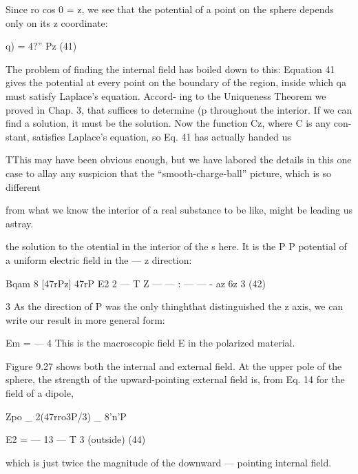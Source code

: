 {Since ro cos 0 = z, we see that the potential of a point on the sphere
depends only on its z coordinate:

\begin{equation}
\end{equation}
q) = 4?'' Pz (41)

The problem of finding the internal field has boiled down to this:
Equation 41 gives the potential at every point on the boundary of
the region, inside which qa must satisfy Laplace's equation. Accord-
ing to the Uniqueness Theorem we proved in Chap. 3, that suffices
to determine (p throughout the interior. If we can find a solution,
it must be the solution. Now the function Cz, where C is any con-
stant, satisfies Laplace's equation, so Eq. 41 has actually handed us

TThis may have been obvious enough, but we have labored the details in this one
case to allay any suspicion that the ``smooth-charge-ball'' picture, which is so different

from what we know the interior of a real substance to be like, might be leading us
astray.

the solution to the otential in the interior of the s here. It is the
P P
potential of a uniform electric field in the  --- z direction:

\begin{equation}
\end{equation}
Bqam 8 [47rPz] 47rP
E2 2  ---  T Z  ---   ---  :  ---  ---  -
az 6z 3 (42)

3
As the direction of P was the only thinghthat distinguished the z axis,
we can write our result in more general form:

\begin{equation}
\end{equation}
Em =  ---  4%
This is the macroscopic field E in the polarized material.

Figure 9.27 shows both the internal and external field. At the
upper pole of the sphere, the strength of the upward-pointing external
field is, from Eq. 14 for the field of a dipole,

\begin{equation}
\end{equation}
Zpo _ 2(47rro3P/3) _ 8'n'P

E2 =  --- 13 ---  T 3 (outside) (44)

which is just twice the magnitude of the downward --- pointing internal
field.

}
